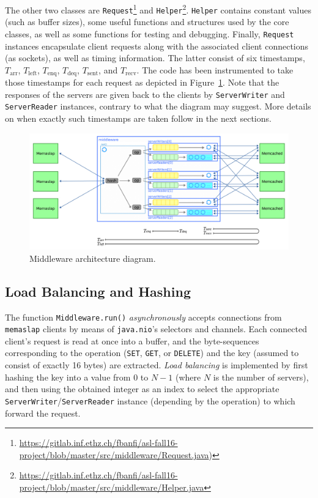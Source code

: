 \documentclass[11pt]{article}
\theoremstyle{definition}
\newcommand\Tarr{T_{\mathrm{arr}}}
\newcommand\Tenq{T_{\mathrm{enq}}}
\newcommand\Tdeq{T_{\mathrm{deq}}}
\newcommand\Tsent{T_{\mathrm{sent}}}
\newcommand\Trecv{T_{\mathrm{recv}}}
\newcommand\Tleft{T_{\mathrm{left}}}
\renewcommand\t\texttt
\begin{document}
The other two classes are \t{Request}\footnote{\mbox{\url{https://gitlab.inf.ethz.ch/fbanfi/asl-fall16-project/blob/master/src/middleware/Request.java})}} and \t{Helper}\footnote{\mbox{\url{https://gitlab.inf.ethz.ch/fbanfi/asl-fall16-project/blob/master/src/middleware/Helper.java}}}.
\t{Helper} contains constant values (such as buffer sizes), some useful functions and structures used by the core classes, as well as some functions for testing and debugging.
Finally, \t{Request} instances encapsulate client requests along with the associated client connections (as sockets), as well as timing information.
The latter consist of six timestamps, $\Tarr$, $\Tleft$, $\Tenq$, $\Tdeq$, $\Tsent$, and $\Trecv$.
The code has been instrumented to take those timestamps for each request as depicted in Figure~\ref{fig:middleware}.
Note that the responses of the servers are given back to the clients by \t{ServerWriter} and \t{ServerReader} instances, contrary to what the diagram may suggest.
More details on when exactly such timestamps are taken follow in the next sections.

\begin{figure}[h]
    \centering
    \includegraphics[scale=0.22]{imgs/middleware}
    \caption{Middleware architecture diagram.}
    \label{fig:middleware}
\end{figure}

\subsection{Load Balancing and Hashing}\label{sec:desc:hashing}

The function \t{Middleware.run()} \emph{asynchronously} accepts connections from \t{memaslap} clients by means of \t{java.nio}'s selectors and channels.
Each connected client's request is read at once into a buffer, and the byte-sequences corresponding to the operation (\t{SET}, \t{GET}, or \t{DELETE}) and the key (assumed to consist of exactly 16 bytes) are extracted.
\emph{Load balancing} is implemented by first hashing the key into a value from $0$ to $N-1$ (where $N$ is the number of servers), and then using the obtained integer as an index to select the appropriate \t{ServerWriter}/\t{ServerReader} instance (depending by the operation) to which forward the request.
\end{document}
